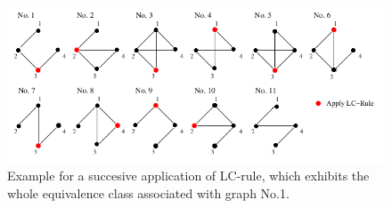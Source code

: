 \documentclass[10pt,a4paper]{book}
\numberwithin{equation}{chapter}
\numberwithin{figure}{chapter}
\numberwithin{table}{chapter}
\begin{document}
\begin{figure}[H]
    \begin{center}
        \includegraphics[scale=0.6]{lcrule.png}
    \end{center}
    \caption{\footnotesize Example for a succesive application of LC-rule, which exhibits the whole equivalence class associated with graph No.1.}
    \label{LCrule}
\end{figure}
\end{document}

